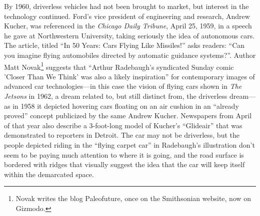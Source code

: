 By 1960, driverless vehicles had not been brought to market, but
interest in the technology continued. Ford's vice president of
engineering and research, Andrew Kucher, was referenced in the \emph{Chicago
Daily Tribune}, April 25, 1959, in a speech he gave at Northwestern
University, taking seriously the idea of autonomous cars. The article,
titled ``In 50 Years: Cars Flying Like Missiles!'' asks readers: ``Can
you imagine flying automobiles directed by automatic guidance
systems?''\cite{???}. Author Matt Novak\footnote{Novak writes the
 blog Paleofuture, once on the Smithsonian website, now on Gizmodo.} suggests that ``Arthur Radebaugh's syndicated
Sunday comic 'Closer Than We Think' was also a likely inspiration''
for contemporary images of advanced car technologies---in this case
the vision of flying cars shown in \emph{The Jetsons} in 1962, a
dream related to, but still distinct from, the driverless dream---as in
1958 it depicted hovering 
cars floating on an air cushion in an ``already proved'' concept
publicized by the same Andrew Kucher\cite{???}. Newspapers from April of that
year also describe a 3-foot-long model of Kucher's ``Glideair'' that was
demonstrated to reporters in Detroit\cite{???}. The car may not be driverless,
but the people depicted riding in the ``flying carpet car'' in
Radebaugh's illustration don't seem to be paying much attention to
where it is going, and the road surface is bordered with ridges that
visually suggest the idea that the car will keep itself within the
demarcated space.

